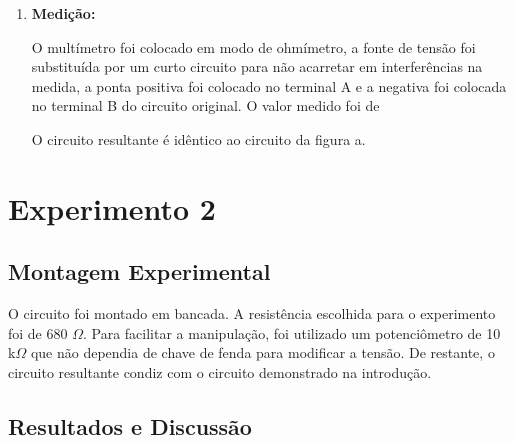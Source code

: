 \documentclass[a4paper,oneside,10pt]{article}
\begin{document}
\begin{enumerate}[label=\alph*]
\begin{enumerate}
	Os cálculos estão presentes no item b. 
	
	\item \textbf{Medição:}
	
	O multímetro foi colocado em modo de ohmímetro, a fonte de tensão foi substituída por um curto circuito para não acarretar em interferências na medida, a ponta positiva foi colocado no terminal A e a negativa foi colocada no terminal B do circuito original.
	O valor medido foi de 
	
	O circuito resultante é idêntico ao circuito da figura a.
\end{enumerate}

\end{enumerate}

\section{Experimento 2}

\subsection{Montagem Experimental}

O circuito foi montado em bancada. A resistência escolhida para o experimento foi de 680 $\Omega$. Para facilitar a manipulação, foi utilizado um potenciômetro de 10 k$\Omega$ que não dependia de chave de fenda para modificar a tensão. De restante, o circuito resultante condiz com o circuito demonstrado na introdução.

\subsection{Resultados e Discussão}
\end{document}
